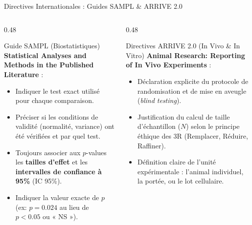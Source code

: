 \documentclass[aspectratio=169,10pt]{beamer}
\begin{document}
\begin{frame}{Directives Internationales : Guides SAMPL \& ARRIVE 2.0}
  \begin{columns}[onlytextwidth, T]
    \begin{column}{0.48\linewidth}
      \begin{conceptbox}{Guide SAMPL (Biostatistiques)}
        \footnotesize
        \textbf{Statistical Analyses and Methods in the Published Literature} :
        \begin{itemize}
          \item Indiquer le test exact utilisé pour chaque comparaison.
          \item Préciser si les conditions de validité (normalité, variance) ont été vérifiées et par quel test.
          \item Toujours associer aux $p$-values les \textbf{tailles d'effet} et les \textbf{intervalles de confiance à 95\%} (IC 95\%).
          \item Indiquer la valeur exacte de $p$ (ex: $p = 0.024$ au lieu de $p < 0.05$ ou « NS »).
        \end{itemize}
      \end{conceptbox}
    \end{column}
    \begin{column}{0.48\linewidth}
      \begin{biobox}{Directives ARRIVE 2.0 (In Vivo \& In Vitro)}
        \footnotesize
        \textbf{Animal Research: Reporting of In Vivo Experiments} :
        \begin{itemize}
          \item Déclaration explicite du protocole de randomisation et de mise en aveugle (\textit{blind testing}).
          \item Justification du calcul de taille d'échantillon ($N$) selon le principe éthique des 3R (Remplacer, Réduire, Raffiner).
          \item Définition claire de l'unité expérimentale : l'animal individuel, la portée, ou le lot cellulaire.
        \end{itemize}
      \end{biobox}
    \end{column}
  \end{columns}
\end{frame}
\end{document}
